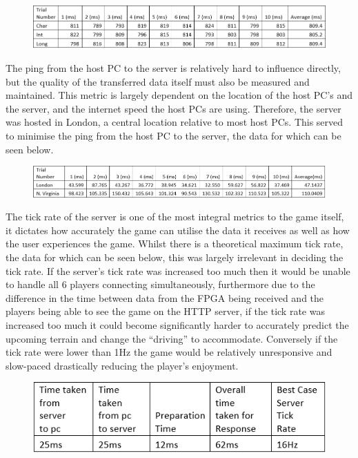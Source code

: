 \documentclass[12pt,a4paper]{article}
\begin{document}
 \par
 \begin{figure} [h!]
    \centering
    \includegraphics[scale = 0.5]{Type.png}
 \end{figure}
 \par
 {\scriptsize The ping from the host PC to the server is relatively hard to influence directly, 
 but the quality of the transferred data itself must also be measured and maintained. 
 This metric is largely dependent on the location of the host PC’s and the server, 
 and the internet speed the host PCs are using. Therefore, the server was hosted in 
 London, a central location relative to most host PCs. This served to minimise the 
 ping from the host PC to the server, the data for which can be seen below.}
 \par
 \begin{figure} [h!]
    \centering
    \includegraphics[scale = 0.5]{Ping.png}
 \end{figure}
 \par
 {\scriptsize The tick rate of the server is one of the most integral metrics to the game itself, 
 it dictates how accurately the game can utilise the data it receives as well as how 
 the user experiences the game. Whilst there is a theoretical maximum tick rate, the 
 data for which can be seen below, this was largely irrelevant in deciding the tick 
 rate. If the server’s tick rate was increased too much then it would be unable to 
 handle all 6 players connecting simultaneously, furthermore due to the difference 
 in the time between data from the FPGA being received and the players being able to 
 see the game on the HTTP server, if the tick rate was increased too much it could 
 become significantly harder to accurately predict the upcoming terrain and change 
 the “driving” to accommodate. Conversely if the tick rate were lower than 1Hz the 
 game would be relatively unresponsive and slow-paced drastically reducing the 
 player’s enjoyment.}
 \par
 \begin{figure} [h!]
    \centering
    \includegraphics[scale = 0.6]{Tick.png}
 \end{figure}
\end{document}
